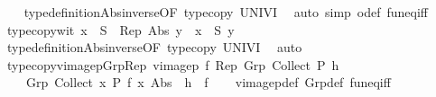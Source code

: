 \begin{isabellebody}
%
\isadelimproof
\ \ %
\endisadelimproof
%
\isatagproof
{}\isamarkupfalse%
\ type{\isacharunderscore}{\kern0pt}definition{\isachardot}{\kern0pt}Abs{\isacharunderscore}{\kern0pt}inverse{\isacharbrackleft}{\kern0pt}OF\ type{\isacharunderscore}{\kern0pt}copy\ UNIV{\isacharunderscore}{\kern0pt}I{\isacharbrackright}{\kern0pt}\ \isamarkupfalse%
\ {\isacharparenleft}{\kern0pt}auto\ simp{\isacharcolon}{\kern0pt}\ o{\isacharunderscore}{\kern0pt}def\ fun{\isacharunderscore}{\kern0pt}eq{\isacharunderscore}{\kern0pt}iff{\isacharparenright}{\kern0pt}%
\endisatagproof
{\isafoldproof}%
%
\isadelimproof
\isanewline
%
\endisadelimproof
\isanewline
{}\isamarkupfalse%
\ type{\isacharunderscore}{\kern0pt}copy{\isacharunderscore}{\kern0pt}wit{\isacharcolon}{\kern0pt}\ {\isachardoublequoteopen}x\ {\isasymin}\ {\isacharparenleft}{\kern0pt}S\ {\isasymcirc}\ Rep{\isacharparenright}{\kern0pt}\ {\isacharparenleft}{\kern0pt}Abs\ y{\isacharparenright}{\kern0pt}\ {\isasymLongrightarrow}\ x\ {\isasymin}\ S\ y{\isachardoublequoteclose}\isanewline
%
\isadelimproof
\ \ %
\endisadelimproof
%
\isatagproof
{}\isamarkupfalse%
\ type{\isacharunderscore}{\kern0pt}definition{\isachardot}{\kern0pt}Abs{\isacharunderscore}{\kern0pt}inverse{\isacharbrackleft}{\kern0pt}OF\ type{\isacharunderscore}{\kern0pt}copy\ UNIV{\isacharunderscore}{\kern0pt}I{\isacharbrackright}{\kern0pt}\ \isamarkupfalse%
\ auto%
\endisatagproof
{\isafoldproof}%
%
\isadelimproof
\isanewline
%
\endisadelimproof
\isanewline
{}\isamarkupfalse%
\ type{\isacharunderscore}{\kern0pt}copy{\isacharunderscore}{\kern0pt}vimage{}p{\isacharunderscore}{\kern0pt}Grp{\isacharunderscore}{\kern0pt}Rep{\isacharcolon}{\kern0pt}\ {\isachardoublequoteopen}vimage{}p\ f\ Rep\ {\isacharparenleft}{\kern0pt}Grp\ {\isacharparenleft}{\kern0pt}Collect\ P{\isacharparenright}{\kern0pt}\ h{\isacharparenright}{\kern0pt}\ {\isacharequal}{\kern0pt}\isanewline
\ \ \ \ Grp\ {\isacharparenleft}{\kern0pt}Collect\ {\isacharparenleft}{\kern0pt}{\isasymlambda}x{\isachardot}{\kern0pt}\ P\ {\isacharparenleft}{\kern0pt}f\ x{\isacharparenright}{\kern0pt}{\isacharparenright}{\kern0pt}{\isacharparenright}{\kern0pt}\ {\isacharparenleft}{\kern0pt}Abs\ {\isasymcirc}\ h\ {\isasymcirc}\ f{\isacharparenright}{\kern0pt}{\isachardoublequoteclose}\isanewline
%
\isadelimproof
\ \ %
\endisadelimproof
%
\isatagproof
{}\isamarkupfalse%
\ vimage{}p{\isacharunderscore}{\kern0pt}def\ Grp{\isacharunderscore}{\kern0pt}def\ fun{\isacharunderscore}{\kern0pt}eq{\isacharunderscore}{\kern0pt}iff\isanewline

\end{isabellebody}
